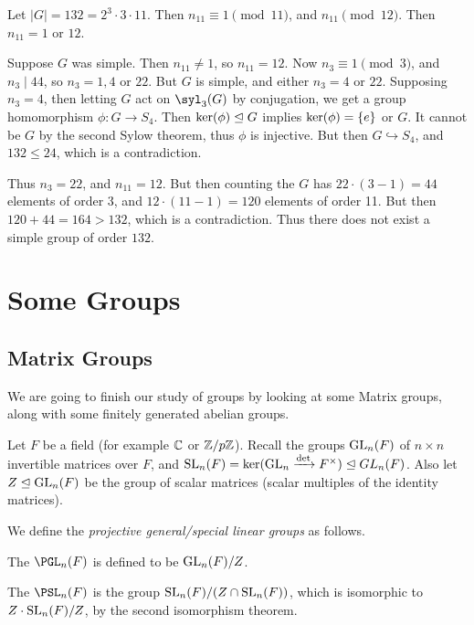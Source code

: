 \documentclass[a4paper]{scrartcl}
\begin{document}
\begin{example}
	Let $|G| = 132 = 2^3 \cdot 3 \cdot 11$. Then $n_{11} \equiv 1 \pmod{11}$, and $n_{11} \pmod 12$. Then $n_{11} = 1$ or $12$. 

	Suppose $G$ was simple. Then $n_{11} \neq 1$, so $n_{11} = 12$. Now $n_3 \equiv 1 \pmod{3}$, and $n_3 \mid 44$, so $n_3 = 1, 4$ or $22$. But $G$ is simple, and either $n_3 = 4$ or $22$. Supposing $n_3 = 4$, then letting $G$ act on $\syl_3(G)$ by conjugation, we get a group homomorphism $\phi: G \rightarrow S_4$. Then $\operatorname{ker}(\phi) \trianglelefteq G$ implies $\operatorname{ker}(\phi) = \{e\}$ or $G$. It cannot be $G$ by the second Sylow theorem, thus $\phi$ is injective. But then $G \hookrightarrow S_4$, and $132 \leq 24$, which is a contradiction.

	Thus $n_3 = 22$, and $n_11 = 12$. But then counting the $G$ has $22 \cdot (3 - 1) = 44$ elements of order 3, and $12 \cdot (11 - 1) = 120$ elements of order 11. But then $120 + 44 = 164 > 132$, which is a contradiction. Thus there does not exist a simple group of order $132$. 
\end{example}

\section{Some Groups}

\subsection{Matrix Groups}

We are going to finish our study of groups by looking at some Matrix groups, along with some finitely generated abelian groups.


Let $F$ be a field (for example $\mathbb{C}$ or $\mathbb{Z}/p\mathbb{Z}$). 
Recall the groups $\operatorname{GL}_n(F)$ of $n \times n$ 
invertible matrices over $F$, and $\operatorname{SL}_n(F) = \operatorname{ker}(\operatorname{GL}_n \xrightarrow{\det} F^\times) \trianglelefteq GL_n(F)$.
Also let $Z \trianglelefteq \operatorname{GL}_n(F)$ be the group of scalar matrices (scalar multiples of the identity matrices). 

We define the \emph{projective general/special linear groups} as follows.

\begin{definition}
	The  $\PGL_n(F)$ is defined to be $\operatorname{GL}_n(F) / Z$.
\end{definition}

\begin{definition}
	The  $\PSL_n(F)$ is the group $\operatorname{SL}_n(F) / (Z \cap  \operatorname{SL}_n(F))$, which is isomorphic to $Z\cdot \operatorname{SL}_n(F) / Z$, by the second isomorphism theorem.
\end{definition}
\end{document}
